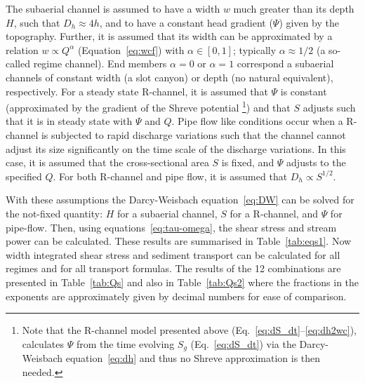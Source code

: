 \documentclass[draft]{agujournal2019}
\begin{document}
The  subaerial channel is assumed to have a width $w$ much greater than its depth $H$, such that $D_h\approx 4h$, and to have a constant head gradient ($\Psi$) given by the topography.
Further, it is  assumed that its width can be approximated by a relation $w \propto Q^\alpha$ (Equation~\ref{eq:wcf}) with $\alpha\in [0,1]$; typically $\alpha \approx 1/2$ (a so-called regime channel).
End members $\alpha=0$ or $\alpha=1$ correspond a  subaerial channels of constant width (a slot canyon) or depth (no natural equivalent), respectively.
%
For a steady state R-channel, it is assumed that  $\Psi$ is constant (approximated by the gradient of the Shreve \citeyear{shreve1972} potential \footnote{Note that the R-channel model presented above (Eq.~\eqref{eq:dS_dt}--\eqref{eq:dh2wc}), calculates $\Psi$ from the time evolving $S_g$ (Eq.~\eqref{eq:dS_dt}) via the Darcy-Weisbach equation~\eqref{eq:dh} and thus no Shreve approximation is then needed.}) and that $S$ adjusts such that it is in steady state with $\Psi$ and $Q$.
%
Pipe flow like conditions occur when a R-channel is subjected to rapid discharge variations such that the channel cannot adjust its size significantly on the time scale of the discharge variations.
In this case, it is assumed that the cross-sectional area $S$ is fixed, and $\Psi$ adjusts to the specified $Q$.
For both R-channel and pipe flow, it is assumed that $D_h \propto S^{1/2}$.

With these assumptions the Darcy-Weisbach equation~\eqref{eq:DW} can be solved for the not-fixed quantity: $H$ for a  subaerial channel, $S$ for a R-channel, and $\Psi$ for pipe-flow.
Then, using equations~\eqref{eq:tau-omega}, the shear stress and stream power can be calculated.
These results are summarised in Table~\ref{tab:eqs1}.
Now width integrated shear stress and sediment transport can be calculated for all regimes and for all transport formulas.  The results of the 12 combinations are presented in Table~\ref{tab:Qs} and also in Table~\ref{tab:Qs2} where the fractions in the exponents are approximately given by decimal numbers for ease of comparison.
\end{document}
